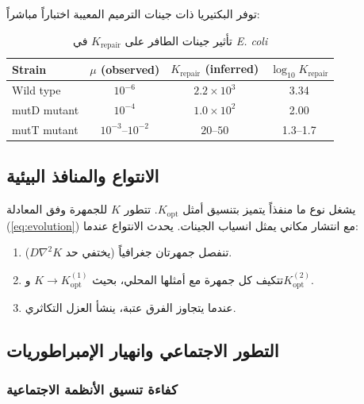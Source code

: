 \documentclass[11pt,a4paper]{article}
\newcommand{\Keffopt}{K_{\mathrm{opt}}}
\begin{document}
	توفر البكتيريا ذات جينات الترميم المعيبة اختباراً مباشراً:
	
	\begin{table}[htbp]
		\begin{otherlanguage}{english}
			\centering
			\caption{Effect of mutator genes on \(K_{\text{repair}}\) in \textit{E. coli}}
			\label{tab:mutators}
			\small
			\begin{tabular}{lccc}
				\toprule
				\textbf{Strain} & $\mu$ (observed) & $K_{\text{repair}}$ (inferred) & $\log_{10} K_{\text{repair}}$ \\
				\midrule
				Wild type & $10^{-6}$ & $2.2 \times 10^3$ & 3.34 \\
				mutD mutant & $10^{-4}$ & $1.0 \times 10^2$ & 2.00 \\
				mutT mutant & $10^{-3}$--$10^{-2}$ & $20$--$50$ & 1.3--1.7 \\
				\bottomrule
			\end{tabular}
		\end{otherlanguage}
		\caption{تأثير جينات الطافر على \(K_{\text{repair}}\) في \textit{E. coli}}
	\end{table}
	
	\subsection{الانتواع والمنافذ البيئية}
	
	يشغل نوع ما منفذاً يتميز بتنسيق أمثل \(\Keffopt\). تتطور \(K\) للجمهرة وفق المعادلة (\ref{eq:evolution}) مع انتشار مكاني يمثل انسياب الجينات. يحدث الانتواع عندما:
	
	\begin{enumerate}
		\item تنفصل جمهرتان جغرافياً (يختفي حد \(D \nabla^2 K\)).
		\item تتكيف كل جمهرة مع أمثلها المحلي، بحيث \(K \to \Keffopt^{(1)}\) و\(\Keffopt^{(2)}\).
		\item عندما يتجاوز الفرق عتبة، ينشأ العزل التكاثري.
	\end{enumerate}
	
	\subsection{التطور الاجتماعي وانهيار الإمبراطوريات}
	\label{subsec:social}
	
	\subsubsection{كفاءة تنسيق الأنظمة الاجتماعية}
	
\end{document}

